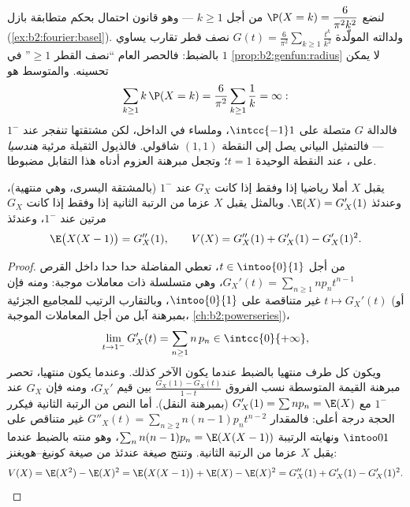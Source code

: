 \begin{example}\label{ex:b2:genfun:heavytail}
لنضع $\P(X = k) = \dfrac{6}{\pi^2k^2}$ من أجل $k \geq 1$ --- وهو قانون احتمال بحكم متطابقة بازل
(\cref{ex:b2:fourier:basel}). ولدالته المولّدة $G(t) = \frac6{\pi^2}\sum_{k\geq1}\frac{t^k}{k^2}$ نصف قطر تقارب يساوي $1$ بالضبط:
فالحصر العام ``نصف القطر $\geq
1$'' في \cref{prop:b2:genfun:radius} لا يمكن تحسينه. والمتوسط
هو
\[
\sum_{k\geq1}k\,\P(X = k) =
\frac6{\pi^2}\sum_{k\geq1}\frac1k = \infty :
\]
فالدالة $G$ متصلة على $\intcc{-1}1$، وملساء في الداخل، لكن مشتقتها
تنفجر عند $1^-$ --- فالتمثيل البياني يصل إلى النقطة $(1, 1)$ 
شاقولي. فالذيول الثقيلة مرئية \emph{هندسيا} على ، عند
النقطة الوحيدة $t = 1$؛ وتجعل مبرهنة العزوم أدناه هذا التقابل مضبوطا.
\end{example}

\begin{theorem}\label{thm:b2:genfun:moments}
يقبل $X$ أملا رياضيا إذا وفقط إذا كانت $G_X$  عند
$1^-$ (بالمشتقة اليسرى، وهي منتهية)، وعندئذ $\E(X) = G_X'(1)$.
وبالمثل يقبل $X$ عزما من الرتبة الثانية إذا وفقط إذا كانت $G_X$
 مرتين عند $1^-$، وعندئذ
\[
\E\bigl(X(X - 1)\bigr) = G_X''(1),
\qquad
V(X) = G_X''(1) + G_X'(1) - G_X'(1)^2 .
\]
\end{theorem}

\begin{proof}
من أجل $t \in \intoo{0}{1}$، تعطي المفاضلة حدا حدا داخل القرص $G_X'(t) = \sum_{n\geq1} np_n t^{n-1}$، وهي متسلسلة
ذات معاملات موجبة: ومنه فإن $t \mapsto G_X'(t)$ غير متناقصة على $\intoo{0}{1}$، وبالتقارب
الرتيب للمجاميع الجزئية (أو بمبرهنة آبل من أجل المعاملات الموجبة،
\cref{ch:b2:powerseries})،
\[
\lim_{t \to 1^-} G_X'(t)
= \sum_{n\geq1} n\,p_n \in \intcc{0}{+\infty} ,
\]
ويكون كل طرف منتهيا بالضبط عندما يكون الآخر كذلك. وعندما يكون منتهيا،
تحصر مبرهنة القيمة المتوسطة نسب الفروق $\frac{G_X(1) -
G_X(t)}{1 - t}$ بين قيم $G_X'$، ومنه
فإن $G_X$  عند $1^-$ مع $G_X'(1) = \sum np_n = \E(X)$ (بمبرهنة النقل). أما
النص من الرتبة الثانية فيكرر الحجة درجة أعلى: فالمقدار $G''_X(t) = \sum_{n\geq2}n(n-1)p_nt^{n-2}$ غير
متناقص على $\intoo01$ ونهايته الرتيبة $\sum_nn(n-1)p_n = \E(X(X-1))$، وهو منته بالضبط عندما
يقبل $X$ عزما من الرتبة الثانية. وتنتج صيغة  عندئذ من صيغة
كونيغ--هويغنز:
\[
V(X) = \E(X^2) - \E(X)^2 = \E\bigl(X(X-1)\bigr) + \E(X) -
\E(X)^2 = G''_X(1) + G'_X(1) - G'_X(1)^2 .
\]
\end{proof}

